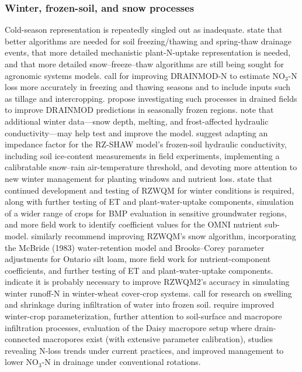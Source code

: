 \subsubsection{Winter, frozen-soil, and snow processes}
Cold-season representation is repeatedly singled out as inadequate. \textcite{Feyereisen2006b} state that better algorithms are needed for soil freezing/thawing and spring-thaw drainage events, that more detailed mechanistic plant-N-uptake representation is needed, and that more detailed snow--freeze--thaw algorithms are still being sought for agronomic systems models. \textcite{Yang2007} call for improving DRAINMOD-N to estimate NO$_3$-N loss more accurately in freezing and thawing seasons and to include inputs such as tillage and intercropping. \textcite{Saadat2020} propose investigating such processes in drained fields to improve DRAINMOD predictions in seasonally frozen regions. \textcite{Jiang2020} note that additional winter data---snow depth, melting, and frost-affected hydraulic conductivity---may help test and improve the model. \textcite{Li2024b} suggest adapting an impedance factor for the RZ-SHAW model's frozen-soil hydraulic conductivity, including soil ice-content measurements in field experiments, implementing a calibratable snow--rain air-temperature threshold, and devoting more attention to new winter management for planting windows and nutrient loss. \textcite{Ahmed2007b} state that continued development and testing of RZWQM for winter conditions is required, along with further testing of ET and plant-water-uptake components, simulation of a wider range of crops for BMP evaluation in sensitive groundwater regions, and more field work to identify coefficient values for the OMNI nutrient sub-model. \textcite{Ahmed2007} similarly recommend improving RZWQM's snow algorithm, incorporating the McBride (1983) water-retention model and Brooks--Corey parameter adjustments for Ontario silt loam, more field work for nutrient-component coefficients, and further testing of ET and plant-water-uptake components. \textcite{Yang2021} indicate it is probably necessary to improve RZWQM2's accuracy in simulating winter runoff-N in winter-wheat cover-crop systems. \textcite{Roy2020} call for research on swelling and shrinkage during infiltration of water into frozen soil. \textcite{Motarjemi2021} require improved winter-crop parameterization, further attention to soil-surface and macropore infiltration processes, evaluation of the Daisy macropore setup where drain-connected macropores exist (with extensive parameter calibration), studies revealing N-loss trends under current practices, and improved management to lower NO$_3$-N in drainage under conventional rotations.


